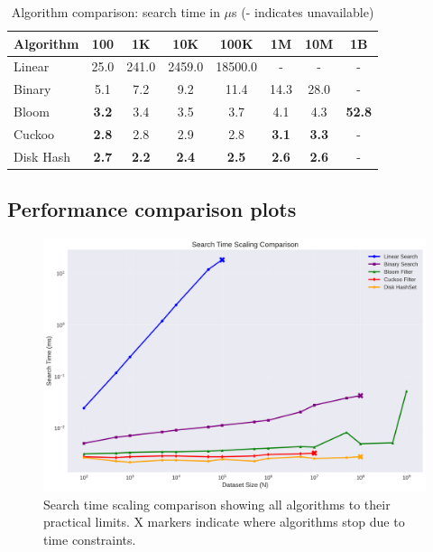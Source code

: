 \documentclass[sigconf]{acmart}
\begin{document}
\begin{table}[h]
\caption{Algorithm comparison: search time in $\mu$s (- indicates unavailable)}
\scriptsize
\begin{tabular}{lccccccc}
\hline
Algorithm & 100 & 1K & 10K & 100K & 1M & 10M & 1B \\
\hline
Linear & 25.0 & 241.0 & 2459.0 & 18500.0 & - & - & - \\
Binary & 5.1 & 7.2 & 9.2 & 11.4 & 14.3 & 28.0 & - \\
Bloom & \textbf{3.2} & 3.4 & 3.5 & 3.7 & 4.1 & 4.3 & \textbf{52.8} \\
Cuckoo & \textbf{2.8} & 2.8 & 2.9 & 2.8 & \textbf{3.1} & \textbf{3.3} & - \\
Disk Hash & \textbf{2.7} & \textbf{2.2} & \textbf{2.4} & \textbf{2.5} & \textbf{2.6} & \textbf{2.6} & - \\
\hline
\end{tabular}
\label{tab:algorithm-comparison}
\end{table}

\subsection{Performance comparison plots}
\begin{figure}[h]
\centering
\includegraphics[width=0.95\linewidth]{search-time-scaling}
\caption{Search time scaling comparison showing all algorithms to their practical limits. X markers indicate where algorithms stop due to time constraints.}
\label{fig:search-time-scaling}
\end{figure}
\end{document}

